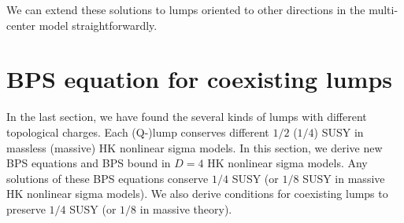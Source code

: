 \documentclass[a4paper,12pt]{article}
\begin{document}
We can extend these solutions 
to lumps oriented to other directions in 
the multi-center model 
straightforwardly. 

\vspace{5mm}

\section{BPS equation for coexisting lumps}\label{sc:BPSeq}
In the last section, 
we have found the several kinds of lumps with different 
topological charges. 
Each (Q-)lump conserves different $1/2$ ($1/4$) SUSY in massless (massive) 
HK nonlinear sigma models.   
In this section, we derive new BPS equations and BPS bound 
in $D=4$ HK nonlinear sigma models. 
Any solutions of these BPS equations conserve $1/4$ SUSY 
(or $1/8$ SUSY in massive HK nonlinear sigma models).
We also derive conditions for 
coexisting lumps to preserve 
$1/4$ SUSY (or $1/8$ in massive theory). 

\end{document}
